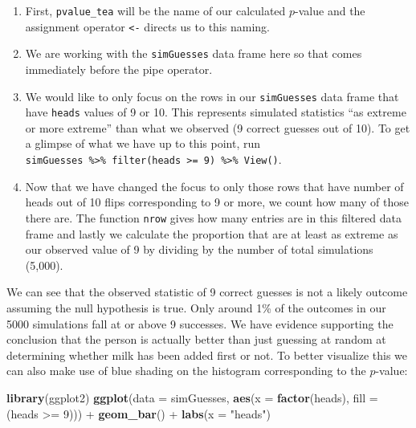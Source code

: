 \documentclass[]{tufte-book}
\newenvironment{Shaded}{\begin{snugshade}}{\end{snugshade}}
\newcommand{\KeywordTok}[1]{\textcolor[rgb]{0.13,0.29,0.53}{\textbf{{#1}}}}
\newcommand{\DataTypeTok}[1]{\textcolor[rgb]{0.13,0.29,0.53}{{#1}}}
\newcommand{\DecValTok}[1]{\textcolor[rgb]{0.00,0.00,0.81}{{#1}}}
\newcommand{\StringTok}[1]{\textcolor[rgb]{0.31,0.60,0.02}{{#1}}}
\newcommand{\NormalTok}[1]{{#1}}
\theoremstyle{definition}
\theoremstyle{definition}
\theoremstyle{remark}
\begin{document}
\begin{enumerate}
\def\labelenumi{\arabic{enumi}.}
\item
  First, \texttt{pvalue\_tea} will be the name of our calculated
  \(p\)-value and the assignment operator \texttt{\textless{}-} directs
  us to this naming.
\item
  We are working with the \texttt{simGuesses} data frame here so that
  comes immediately before the pipe operator.\\
\item
  We would like to only focus on the rows in our \texttt{simGuesses}
  data frame that have \texttt{heads} values of 9 or 10. This represents
  simulated statistics ``as extreme or more extreme'' than what we
  observed (9 correct guesses out of 10). To get a glimpse of what we
  have up to this point, run
  \texttt{simGuesses\ \%\textgreater{}\%\ filter(heads\ \textgreater{}=\ 9)\ \%\textgreater{}\%\ View()}.
\item
  Now that we have changed the focus to only those rows that have number
  of heads out of 10 flips corresponding to 9 or more, we count how many
  of those there are. The function \texttt{nrow} gives how many entries
  are in this filtered data frame and lastly we calculate the proportion
  that are at least as extreme as our observed value of 9 by dividing by
  the number of total simulations (5,000).
\end{enumerate}

We can see that the observed statistic of 9 correct guesses is not a
likely outcome assuming the null hypothesis is true. Only around 1\% of
the outcomes in our 5000 simulations fall at or above 9 successes. We
have evidence supporting the conclusion that the person is actually
better than just guessing at random at determining whether milk has been
added first or not. To better visualize this we can also make use of
blue shading on the histogram corresponding to the \(p\)-value:

\begin{Shaded}
\begin{Highlighting}[]
\KeywordTok{library}\NormalTok{(ggplot2)}
\KeywordTok{ggplot}\NormalTok{(}\DataTypeTok{data =} \NormalTok{simGuesses, }\KeywordTok{aes}\NormalTok{(}\DataTypeTok{x =} \KeywordTok{factor}\NormalTok{(heads), }\DataTypeTok{fill =} \NormalTok{(heads >=}\StringTok{ }\DecValTok{9}\NormalTok{))) +}
\StringTok{  }\KeywordTok{geom_bar}\NormalTok{() +}
\StringTok{  }\KeywordTok{labs}\NormalTok{(}\DataTypeTok{x =} \StringTok{"heads"}\NormalTok{)}
\end{Highlighting}
\end{Shaded}
\end{document}
